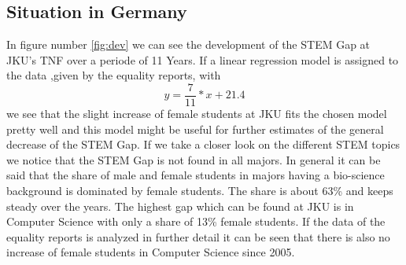 \documentclass[12pt]{article}
\begin{document}
\subsection{Situation in Germany}
In figure number \ref{fig:dev} we can see the development of the STEM Gap at JKU's TNF over a periode of 11 Years. If   a linear regression model is assigned to the data ,given by the equality reports, with 
\begin{equation}
y= \frac{7}{11}*x+21.4
\end{equation}  we see that the slight increase of female students at JKU fits the chosen model pretty well and this model might be useful for further estimates of the general decrease of the STEM Gap.
If we take a closer look on the different STEM topics we notice that the STEM Gap is not found in all majors. In general it can be said that the share of male and female students in majors having a bio-science background   is dominated by female students. The share is about 63\% and keeps steady over the years. 
The highest gap which can be found at JKU is in Computer Science with only a share of 13\% female students. If the data of the equality reports is analyzed in further detail it can be seen that there is also no increase of female students in Computer Science since 2005. 



\newpage


\newpage
\listoffigures
\listoftables
\end{document}
